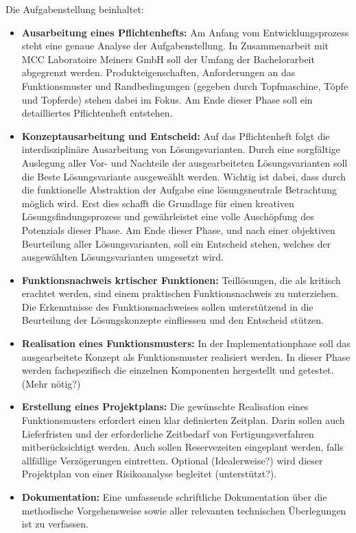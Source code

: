 Die Aufgabenstellung beinhaltet:
\begin{itemize}
	\item \textbf{Ausarbeitung eines Pflichtenhefts:} Am Anfang vom Entwicklungsprozess steht eine genaue Analyse der Aufgabenstellung. In Zusammenarbeit mit MCC Laboratoire Meiners GmbH soll der Umfang der Bachelorarbeit abgegrenzt werden. Produkteigenschaften, Anforderungen an das Funktionsmuster und Randbedingungen (gegeben durch Topfmaschine, Töpfe und Topferde) stehen dabei im Fokus. Am Ende dieser Phase soll ein detailliertes Pflichtenheft entstehen.
	 
	\item \textbf{Konzeptausarbeitung und Entscheid:} Auf das Pflichtenheft folgt die interdisziplinäre Ausarbeitung von Lösungsvarianten. Durch eine sorgfältige Auslegung aller Vor- und Nachteile der ausgearbeiteten Lösungsvarianten soll die Beste Lösungsvariante ausgeweählt werden. Wichtig ist dabei, dass durch die funktionelle Abstraktion der Aufgabe eine lösungsneutrale Betrachtung möglich wird. Erst dies schafft die Grundlage für einen kreativen Lösungsfindungsprozess und gewährleistet eine volle Auschöpfung des Potenzials dieser Phase. Am Ende dieser Phase, und nach einer objektiven Beurteilung aller Lösungsvarianten, soll ein Entscheid stehen, welches der ausgewählten Lösungsvarianten umgesetzt wird.
	
	\item \textbf{Funktionsnachweis krtischer Funktionen:} Teillösungen, die als kritisch erachtet werden, sind einem praktischen Funktionsnachweis zu unterziehen. Die Erkenntnisse des Funktionsnachweises sollen unterstützend in die Beurteilung der Lösungskonzepte einfliessen und den Entscheid stützen.
	
	\item \textbf{Realisation eines Funktionsmusters:} In der Implementationphase soll das ausgearbeitete Konzept als Funktionsmuster realisiert werden. In dieser Phase werden fachspezifisch die einzelnen Komponenten hergestellt und getestet. (Mehr nötig?)
	
	\item \textbf{Erstellung eines Projektplans:} Die gewünschte Realisation eines Funktionsmusters erfordert einen klar definierten Zeitplan. Darin sollen auch Lieferfristen und der erforderliche Zeitbedarf von Fertigungsverfahren mitberücksichtigt werden. Auch sollen Reservezeiten eingeplant werden, falls allfällige Verzögerungen eintretten. Optional (Idealerweise?) wird dieser Projektplan von einer Risikoanalyse begleitet (unterstützt?).
	
	\item \textbf{Dokumentation:} Eine umfassende schriftliche Dokumentation über die methodische Vorgehensweise sowie aller relevanten technischen Überlegungen ist zu verfassen. 
	
\end{itemize}